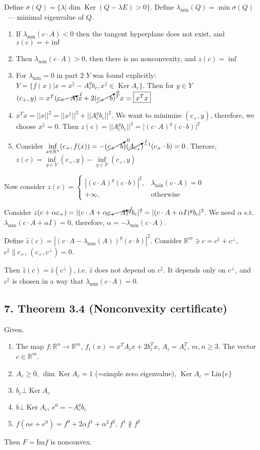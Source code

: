 \documentclass[a4paper]{article}
\DeclareMathOperator{\Ker}{Ker}
\begin{document}
Define $\sigma(Q)=\{\lambda\big |\dim\Ker (Q-\lambda E)>0\}$. Define $\lambda_{\min}(Q)=\min\sigma(Q)$~--- minimal eigenvalue of $Q$.

\begin{enumerate}
\item If $\lambda_{\min}(c\cdot A)<0$ then the tangent hyperplane does not exist, and $z(c)=+\inf$
\item Then $\lambda_{\min}(c\cdot A)>0$, then there is no nonconvexity, and $z(c)=\inf$
\item For $\lambda_{\min}=0$ in part 2 $Y$ was found explicitly: $Y=\{f(x)\big|x=x^\parallel-A_c^gb_c, x^\parallel \in\Ker A_c\}$. Then for $y\in Y$ $(c_+,y)=x^T(\cancelto{I}{c_+\cdot A})x+2(\cancelto{0}{c_+\cdot b})^Tx=\boxed{x^Tx}$
\item $x^Tx=||x||^2=||x^\parallel||^2+||A_c^gb_c||^2$. We want to minimize $(c_+,y)$, therefore, we choose $x^\parallel=0$. Then $z(c)=||A_c^gb_c||^2=\boxed{\big|(c \cdot A)^g(c\cdot b) \big|^2}$
\item Consider $\inf\limits_{x\in\mathbb{R}^n} (c_+,f(x))=-(\cancelto{0}{c_+\cdot b})(\cancelto{I}{A_{c_+}})^{-1}(c_+\cdot b)=0$. Therore, $z(c)=\inf\limits_{y\in Y}(c_+,y)-\inf\limits_{y\in F}(c_+,y)$
\end{enumerate}

Now consider $z(c)=\begin{cases}
|(c\cdot A)^g(c\cdot b)|^2,&\lambda_{\min}(c\cdot A)=0\\
+\infty, & \mbox{otherwise}
\end{cases}$

Consider $z(c+\alpha c_+)=|(c\cdot A+\alpha \cancelto{I}{c_+\cdot A})^gb_c|^2=|(c\cdot A+\alpha I)^gb_c|^2$. We need $\alpha$ s.t. $\lambda_{\min}(c\cdot A+\alpha I)=0$, therefore, $\alpha=-\lambda_{\min}(c\cdot A)$.

Define $\hat{z}(c)=|(c\cdot A-\lambda_{\min}(A))^g(c\cdot b)|^2$. Consider $\mathbb{R}^m\ni c=c^{\parallel}+c^{\bot}$, $c^{\parallel}\parallel c_+$, $(c_+,c^{\bot})=0$.

Then $\hat{z}(c)=\hat{z}(c^{\bot})$, i.e. $\hat{z}$ does not depend on $c^{\parallel}$. It depends only on $c^{\bot}$, and $c^{\parallel}$ is chosen in a way that $\lambda_{\min}(c\cdot A)=0$.
\subsection*{7. Theorem 3.4 (Nonconvexity certificate)}
Given.
\begin{enumerate}
\item The map $f\colon\mathbb{R}^n\to\mathbb{R}^m$, $f_i(x)=x^TA_ix+2b_i^Tx$, $A_i=A_i^T$, $m,n\geqslant 3$. The vector $c\in\mathbb{R}^m$.
\item $A_c\geqslant 0$, $\dim\Ker A_c=1$ (=simple zero eigenvalue), $\Ker A_c=\mbox{Lin}\{e\}$
\item $b_c\bot \Ker A_c$
\item $b\bot\Ker A_c$, $e^0=-A_c^gb_c$
\item $f(\alpha e+e^0)=f^0+2\alpha f^1+\alpha^2f^2$, $f^1\nparallel f^2$
\end{enumerate}
Then $F=\mbox{Im} f$ is nonconvex.
\end{document}
